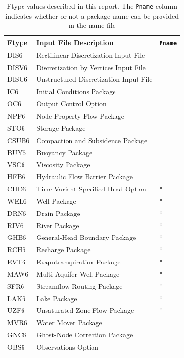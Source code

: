 \begin{table}[h]
\caption{Ftype values described in this report.  The \texttt{Pname} column indicates whether or not a package name can be provided in the name file}
\small
\begin{center}
\begin{tabular*}{\columnwidth}{l l l}
\hline
\hline
Ftype & Input File Description & \texttt{Pname}\\
\hline
DIS6 & Rectilinear Discretization Input File \\
DISV6 & Discretization by Vertices Input File \\
DISU6 & Unstructured Discretization Input File \\
IC6 & Initial Conditions Package \\
OC6 & Output Control Option \\
NPF6 & Node Property Flow Package \\ 
STO6 & Storage Package \\
CSUB6 & Compaction and Subsidence Package \\
BUY6 & Buoyancy Package \\
VSC6 & Viscosity Package \\
HFB6 & Hydraulic Flow Barrier Package\\
CHD6 & Time-Variant Specified Head Option & * \\
WEL6 & Well Package & * \\
DRN6 & Drain Package & * \\
RIV6 & River Package & * \\
GHB6 & General-Head Boundary Package & * \\
RCH6 & Recharge Package & * \\
EVT6 & Evapotranspiration Package & * \\
MAW6 & Multi-Aquifer Well Package & * \\
SFR6 & Streamflow Routing Package & * \\
LAK6 & Lake Package & * \\
UZF6 & Unsaturated Zone Flow Package & * \\
MVR6 & Water Mover Package \\
GNC6 & Ghost-Node Correction Package \\
OBS6 & Observations Option \\
\hline 
\end{tabular*}
\label{table:ftype-gwf}
\end{center}
\normalsize
\end{table}

